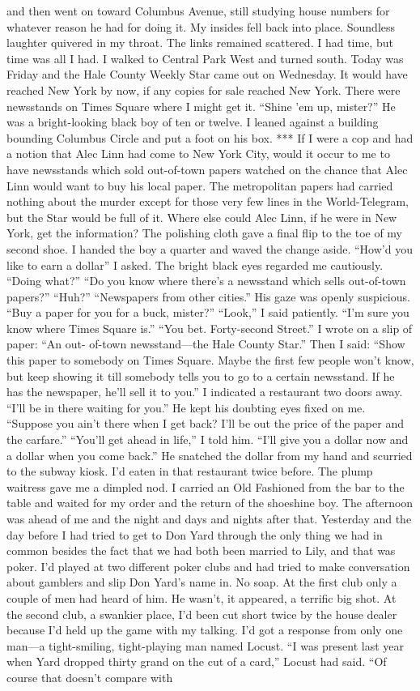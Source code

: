 \documentclass{novel}
\begin{document}
and then went on toward Columbus Avenue, still studying house numbers for whatever reason he had for doing it. My insides fell back into place. Soundless laughter quivered in my throat. The links remained scattered. I had time, but time was all I had. I walked to Central Park West and turned south. Today was Friday and the Hale County Weekly Star came out on Wednesday. It would have reached New York by now, if any copies for sale reached New York. There were newsstands on Times Square where I might get it. “Shine ’em up, mister?” He was a bright-looking black boy of ten or twelve. I leaned against a building bounding Columbus Circle and put a foot on his box. *** If I were a cop and had a notion that Alec Linn had come to New York City, would it occur to me to have newsstands which sold out-of-town papers watched on the chance that Alec Linn would want to buy his local paper. The metropolitan papers had carried nothing about the murder except for those very few lines in the World-Telegram, but the Star would be full of it. Where else could Alec Linn, if he were in New York, get the information? The polishing cloth gave a final flip to the toe of my second shoe. I handed the boy a quarter and waved the change aside. “How’d you like to earn a dollar” I asked. The bright black eyes regarded me cautiously. “Doing what?” “Do you know where there’s a newsstand which sells out-of-town papers?” “Huh?” “Newspapers from other cities.” His gaze was openly suspicious. “Buy a paper for you for a buck, mister?” “Look,” I said patiently. “I’m sure you know where Times Square is.” “You bet. Forty-second Street.” I wrote on a slip of paper: “An out- of-town newsstand—the Hale County Star.” Then I said: “Show this paper to somebody on Times Square. Maybe the first few people won’t know, but keep showing it till somebody tells you to go to a certain newsstand. If he has the newspaper, he’ll sell it to you.” I indicated a restaurant two doors away. “I’ll be in there waiting for you.” He kept his doubting eyes fixed on me. “Suppose you ain’t there when I get back? I’ll be out the price of the paper and the carfare.” “You’ll get ahead in life,” I told him. “I’ll give you a dollar now and a dollar when you come back.” He snatched the dollar from my hand and scurried to the subway kiosk. I’d eaten in that restaurant twice before. The plump waitress gave me a dimpled nod. I carried an Old Fashioned from the bar to the table and waited for my order and the return of the shoeshine boy. The afternoon was ahead of me and the night and days and nights after that. Yesterday and the day before I had tried to get to Don Yard through the only thing we had in common besides the fact that we had both been married to Lily, and that was poker. I’d played at two different poker clubs and had tried to make conversation about gamblers and slip Don Yard’s name in. No soap. At the first club only a couple of men had heard of him. He wasn’t, it appeared, a terrific big shot. At the second club, a swankier place, I’d been cut short twice by the house dealer because I’d held up the game with my talking. I’d got a response from only one man—a tight-smiling, tight-playing man named Locust. “I was present last year when Yard dropped thirty grand on the cut of a card,” Locust had said. “Of course that doesn’t compare with 
\end{document}
